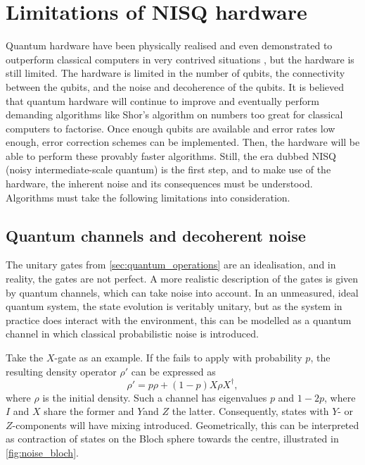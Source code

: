 \section{Limitations of NISQ hardware}
\label{sec:nisq}
Quantum hardware have been physically realised and even demonstrated to outperform classical computers in very contrived situations \autocite{arute2019, zhong2020, madsen2022}, but the hardware is still limited.
The hardware is limited in the number of qubits, the connectivity between the qubits, and the noise and decoherence of the qubits.
It is believed that quantum hardware will continue to improve and eventually perform demanding algorithms like Shor's algorithm on numbers too great for classical computers to factorise.
Once enough qubits are available and error rates low enough, error correction schemes can be implemented.
Then, the hardware will be able to perform these provably faster algorithms.
Still, the era dubbed NISQ (noisy intermediate-scale quantum) is the first step, and to make use of the hardware, the inherent noise and its consequences must be understood.
Algorithms must take the following limitations into consideration.

\subsection{Quantum channels and decoherent noise}
The unitary gates from \cref{sec:quantum_operations} are an idealisation, and in reality, the gates are not perfect.
A more realistic description of the gates is given by quantum channels, which can take noise into account.
In an unmeasured, ideal quantum system, the state evolution is veritably unitary, but as the system in practice does interact with the environment, this can be modelled as a quantum channel in which classical probabilistic noise is introduced.

Take the $X$-gate as an example.
If the fails to apply with probability $p$, the resulting density operator $\rho'$ can be expressed as
\begin{equation}
    \rho' = p\rho + (1-p)X\rho X^\dagger,
\end{equation}
where $\rho$ is the initial density.
Such a channel has eigenvalues $p$ and $1-2p$, where $I$ and $X$ share the former and $Y$and $Z$ the latter.
Consequently, states with $Y$- or $Z$-components will have mixing introduced.
Geometrically, this can be interpreted as contraction of states on the Bloch sphere towards the centre, illustrated in \cref{fig:noise_bloch}.

